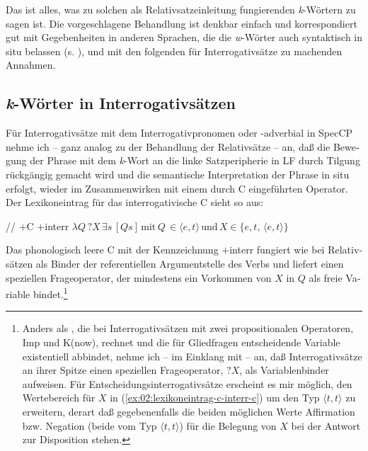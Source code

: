 \documentclass[output=paper, colorlinks, citecolor=brown, booklanguage=german]{langscibook}
\begin{document}
\begin{otherlanguage}{german}
Das ist alles, was zu solchen als Relativsatzeinleitung fungierenden \textit{k}-Wörtern zu sagen ist. Die vorgeschlagene Behandlung ist denkbar einfach und kor\-res\-pon\-diert gut mit Gegebenheiten in anderen Sprachen, die die \textit{w}-Wörter auch syntaktisch in situ belassen (s. \citealt{Tsai1999}), und mit den folgenden für Interrogativsätze zu machenden Annahmen.

\subsection{\textit{k}-Wörter in Interrogativsätzen}\label{sec:zi02:interrogativ}

Für Interrogativsätze mit dem Interrogativpronomen oder -adverbial in SpecCP nehme ich -- ganz analog zu der Behandlung der Relativsätze -- an, daß die Bewegung der Phrase mit dem \textit{k}-Wort an die linke Satzperipherie in LF durch Tilgung rückgängig gemacht wird und die semantische Interpretation der Phrase in situ erfolgt, wieder im Zusammenwirken mit einem durch C eingeführten Operator. Der Lexikoneintrag für das interrogativische C sieht so aus:

\ea\label{ex:02:lexikoneintrag-c-interr}
    \ea /\varnothing/
    \ex\label{ex:02:lexikoneintrag-c-interr-b} $+$C $+$interr
    \ex\label{ex:02:lexikoneintrag-c-interr-c} $\lambda Q\, ?X\, \exists s\, [ Q s ]\, \textrm{mit}\, Q\, \in \langle e,t\rangle\, \textrm{und}\, X \in \{e, t,\, \langle e,t\rangle \}$
    \z
\z 

\noindent Das phonologisch leere C mit der Kennzeichnung $+$interr fungiert wie bei Relativsätzen als Binder der referentiellen Argumentstelle des Verbs und liefert einen speziellen Frageoperator, der mindestens ein Vorkommen von $X$ in $Q$ als freie Variable bindet.\footnote{Anders als \citet[Kap. XII]{Paduceva1985}, die bei Interrogativsätzen mit zwei propositionalen Ope\-ra\-to\-ren, Imp und K(now), rechnet und die für Gliedfragen entscheidende Variable existentiell abbindet, nehme ich -- im Einklang mit \citet{Brandt.etal1992} -- an, daß Interrogativsätze an ihrer Spitze einen speziellen Frageoperator, $?X$, als Variablenbinder aufweisen. Für Entscheidungsinterrogativsätze erscheint es mir möglich, den Wertebereich für $X$ in (\ref{ex:02:lexikoneintrag-c-interr-c}) um den Typ $\langle t,t\rangle$ zu erweitern, derart daß gegebenenfalls die beiden möglichen Werte Affirmation bzw. Negation (beide vom Typ $\langle t,t\rangle$) für die Belegung von $X$ bei der Antwort zur Disposition stehen.}


\end{otherlanguage}
\end{document}

